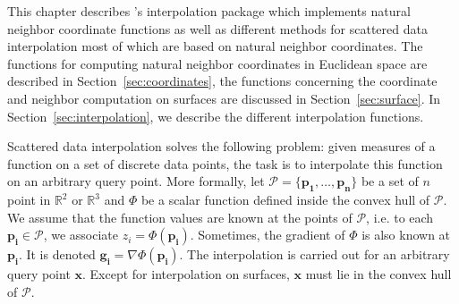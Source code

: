 This chapter describes \cgal's interpolation package which implements
natural neighbor coordinate functions as well as different
methods for scattered data interpolation most of which are based on
natural neighbor coordinates. The functions for computing natural neighbor 
coordinates in Euclidean space are described in 
Section~\ref{sec:coordinates}, 
the functions concerning the coordinate and neighbor 
computation on surfaces are discussed in Section~\ref{sec:surface}. 
In Section~\ref{sec:interpolation}, we describe the different interpolation 
functions.   

Scattered data interpolation solves the following problem: given
measures of a function on a set of discrete data points, the task is
to interpolate this function on an arbitrary query point.
More formally, let $\mathcal{P}=\{\mathbf{p_1},\ldots ,\mathbf{p_n}\}$ be a set of
$n$ point in $\mathbb{R}^2$ or $\mathbb{R}^3$ and $\Phi$ be a scalar
function defined inside the convex hull of $\mathcal{P}$. We assume that
the function values are known at the points of $\mathcal{P}$, i.e. to
each $\mathbf{p_i} \in \mathcal{P}$, we associate $z_i =
\Phi(\mathbf{p_i})$. Sometimes, the gradient of $\Phi$ is also known
at $\mathbf{p_i}$. It is denoted $\mathbf{g_i}= \nabla
\Phi(\mathbf{p_i})$. The interpolation is carried out for an arbitrary query point
$\mathbf{x}$. Except for interpolation on surfaces, $\mathbf{x}$ must lie 
in the convex hull of $\mathcal{P}$.
